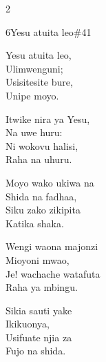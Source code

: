 \begin{multicols}{2}
\begin{hymn}{6}{Yesu atuita leo}{\#41}
\begin{stanza}
Yesu atuita leo,\\
Ulimwenguni;\\
Usisitesite bure,\\
Unipe moyo.
\end{stanza}
\begin{chorus}
Itwike nira ya Yesu,\\
Na uwe huru:\\
Ni wokovu halisi,\\
Raha na uhuru.
\end{chorus}
\begin{stanza}
Moyo wako ukiwa na\\
Shida na fadhaa,\\
Siku zako zikipita\\
Katika shaka.
\end{stanza}
\begin{stanza}
Wengi waona majonzi\\
Mioyoni mwao,\\
Je! wachache watafuta\\
Raha ya mbingu.
\end{stanza}
\begin{stanza}
Sikia sauti yake\\
Ikikuonya,\\
Usifuate njia za\\
Fujo na shida.
\end{stanza}
\end{hymn}


\end{multicols}

